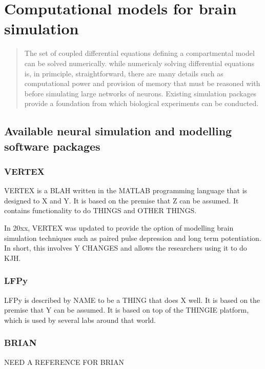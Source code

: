\section{Computational models for brain simulation}

\begin{quote}
    The set of coupled differential equations defining a compartmental model can
    be solved numerically. while numericaly solving differential equations is,
    in primciple, straightforward, there are many details such as computational
    power and provision of memory that must be reasoned with before simulating
    large networks of neurons. Existing simulation packages provide a
    foundation from which biological experiments can be conducted. 
\end{quote}

\subsection{Available neural simulation and modelling software packages}
\subsubsection{VERTEX}
VERTEX is a BLAH written in the MATLAB programming language that is designed to
X and Y. It is based on the premise that Z can be assumed. It contains
functionality to do THINGS and OTHER THINGS. 

In 20xx, VERTEX was updated to provide the option of modelling brain simulation
techniques such as paired pulse depression and long term potentiation. In short,
this involves Y CHANGES and allows the researchers using it to do KJH.


\autocite{tomsett_virtual_2015} \autocite{thornton_virtual_2019}
\subsubsection{LFPy}
LFPy is described by NAME to be a THING that does X well. It is based on the
premise that Y can be assumed. It is based on top of the THINGIE platform, which
is used by several labs around that world.
\autocite{hagen_lfpy_2019} \autocite{hagen_hybrid_2016}
\subsubsection{BRIAN}
NEED A REFERENCE FOR BRIAN
